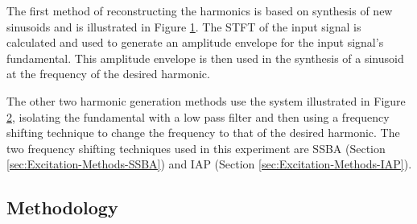 		The first method of reconstructing the harmonics is based on synthesis of new sinusoids and is illustrated
		in Figure \ref{fig:Synthesise}. The STFT of the input signal is calculated and used to generate an
		amplitude envelope for the input signal's fundamental. This amplitude envelope is then used in the
		synthesis of a sinusoid at the frequency of the desired harmonic.

		\begin{figure}[h!]
			\centering
			\caption{}
			\label{fig:Synthesise}
		\end{figure}

		The other two harmonic generation methods use the system illustrated in Figure \ref{fig:FilterAndShift},
		isolating the fundamental with a low pass filter and then using a frequency shifting technique to change
		the frequency to that of the desired harmonic. The two frequency shifting techniques used in this
		experiment are SSBA (Section \ref{sec:Excitation-Methods-SSBA}) and IAP (Section
		\ref{sec:Excitation-Methods-IAP}).

		\begin{figure}[h!]
			\centering
			\caption{}
			\label{fig:FilterAndShift}
		\end{figure}

	\subsection{Methodology}
	\label{sec:PerceptualExperiments-Reconstruction-Methodology}
